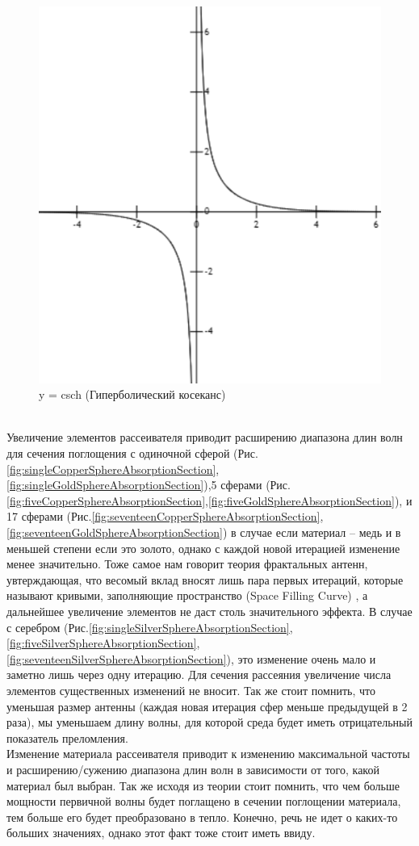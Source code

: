 \begin{figure}[h!]
	\centering
	\includegraphics[width=0.32\linewidth]{csch}
	\caption{y = csch (Гиперболический косеканс)}
	\label{fig:csch}
\end{figure}\\
Увеличение элементов рассеивателя приводит расширению диапазона длин волн для сечения поглощения с одиночной сферой (Рис.\ref{fig:singleCopperSphereAbsorptionSection},\ref{fig:singleGoldSphereAbsorptionSection}),5 сферами (Рис.\ref{fig:fiveCopperSphereAbsorptionSection},\ref{fig:fiveGoldSphereAbsorptionSection}), и 17 сферами (Рис.\ref{fig:seventeenCopperSphereAbsorptionSection},\ref{fig:seventeenGoldSphereAbsorptionSection}) в случае если материал – медь и в меньшей степени если это золото, однако с каждой новой итерацией изменение менее значительно. Тоже самое нам говорит теория фрактальных антенн, увтерждающая, что весомый вклад вносят лишь пара первых итераций, которые называют кривыми, заполняющие пространство (Space Filling Curve) \cite{b12}\cite{b13}, а дальнейшее увеличение элементов не даст столь значительного эффекта.  В случае с серебром (Рис.\ref{fig:singleSilverSphereAbsorptionSection},\ref{fig:fiveSilverSphereAbsorptionSection},\ref{fig:seventeenSilverSphereAbsorptionSection}), это изменение очень мало и заметно лишь через одну итерацию. Для сечения рассеяния увеличение числа элементов существенных изменений не вносит. Так же стоит помнить, что уменьшая размер антенны (каждая новая итерация сфер меньше предыдущей в 2 раза), мы уменьшаем длину волны, для которой среда будет иметь отрицательный показатель преломления. \\
Изменение материала рассеивателя приводит к изменению максимальной частоты и расширению/сужению диапазона длин волн в зависимости от того, какой материал был выбран. Так же исходя из теории стоит помнить, что чем больше мощности первичной волны будет поглащено в сечении поглощении материала, тем больше его будет преобразовано в тепло. Конечно, речь не идет о каких-то больших значениях, однако этот факт тоже стоит иметь ввиду.
